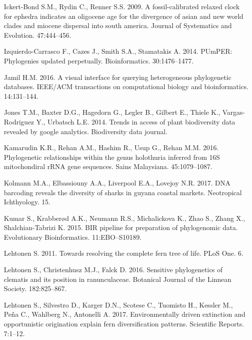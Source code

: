 \documentclass[]{article}
\begin{document}
\leavevmode\hypertarget{ref-ickert2009fossil}{}%
Ickert-Bond S.M., Rydin C., Renner S.S. 2009. A fossil-calibrated relaxed clock for ephedra indicates an oligocene age for the divergence of asian and new world clades and miocene dispersal into south america. Journal of Systematics and Evolution. 47:444--456.

\leavevmode\hypertarget{ref-izquierdo2014pumper}{}%
Izquierdo-Carrasco F., Cazes J., Smith S.A., Stamatakis A. 2014. PUmPER: Phylogenies updated perpetually. Bioinformatics. 30:1476--1477.

\leavevmode\hypertarget{ref-jamil2016visual}{}%
Jamil H.M. 2016. A visual interface for querying heterogeneous phylogenetic databases. IEEE/ACM transactions on computational biology and bioinformatics. 14:131--144.

\leavevmode\hypertarget{ref-jones2014trends}{}%
Jones T.M., Baxter D.G., Hagedorn G., Legler B., Gilbert E., Thiele K., Vargas-Rodriguez Y., Urbatsch L.E. 2014. Trends in access of plant biodiversity data revealed by google analytics. Biodiversity data journal.

\leavevmode\hypertarget{ref-kamarudin2016phylogenetic}{}%
Kamarudin K.R., Rehan A.M., Hashim R., Usup G., Rehan M.M. 2016. Phylogenetic relationships within the genus holothuria inferred from 16S mitochondiral rRNA gene sequences. Sains Malaysiana. 45:1079--1087.

\leavevmode\hypertarget{ref-kolmann2017dna}{}%
Kolmann M.A., Elbassiouny A.A., Liverpool E.A., Lovejoy N.R. 2017. DNA barcoding reveals the diversity of sharks in guyana coastal markets. Neotropical Ichthyology. 15.

\leavevmode\hypertarget{ref-kumar2015bir}{}%
Kumar S., Krabberød A.K., Neumann R.S., Michalickova K., Zhao S., Zhang X., Shalchian-Tabrizi K. 2015. BIR pipeline for preparation of phylogenomic data. Evolutionary Bioinformatics. 11:EBO--S10189.

\leavevmode\hypertarget{ref-lehtonen2011towards}{}%
Lehtonen S. 2011. Towards resolving the complete fern tree of life. PLoS One. 6.

\leavevmode\hypertarget{ref-lehtonen2016sensitive}{}%
Lehtonen S., Christenhusz M.J., Falck D. 2016. Sensitive phylogenetics of clematis and its position in ranunculaceae. Botanical Journal of the Linnean Society. 182:825--867.

\leavevmode\hypertarget{ref-lehtonen2017environmentally}{}%
Lehtonen S., Silvestro D., Karger D.N., Scotese C., Tuomisto H., Kessler M., Peña C., Wahlberg N., Antonelli A. 2017. Environmentally driven extinction and opportunistic origination explain fern diversification patterns. Scientific Reports. 7:1--12.
\end{document}
